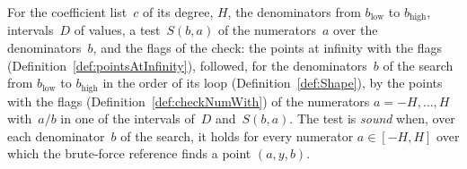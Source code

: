 \begin{definition}\label{def:searchList}
  \leanok
  For the coefficient list~$c$ of its degree, $H$, the denominators from $b_{\mathrm{low}}$ to
  $b_{\mathrm{high}}$, intervals~$D$ of values, a test~$S(b, a)$ of the numerators~$a$ over the
  denominators~$b$, and the flags of the check: the points at infinity with the flags
  (Definition~\ref{def:pointsAtInfinity}), followed, for the denominators~$b$ of the search from
  $b_{\mathrm{low}}$ to $b_{\mathrm{high}}$ in the order of its loop (Definition~\ref{def:Shape}),
  by the points with the flags (Definition~\ref{def:checkNumWith}) of the numerators
  $a = -H, \dots, H$ with~$a/b$ in one of the intervals of~$D$ and~$S(b, a)$. The test is
  \emph{sound} when, over each denominator~$b$ of the search, it holds for every numerator
  $a \in [-H, H]$ over which the brute-force reference finds a point $(a, y, b)$.
\end{definition}

